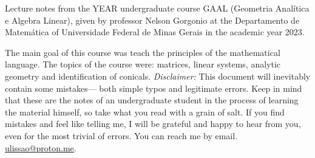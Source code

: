 Lecture notes from the YEAR undergraduate course GAAL (Geometria Analítica e Algebra Linear), given by professor
Nelson Gorgonio at the Departamento de Matemática of Universidade Federal de Minas Gerais in the academic year 2023.

The main goal of this course was teach the principles of the mathematical language. The topics of the course were: matrices, linear systems, analytic geometry  and identification of conicals.
\textit{Disclaimer:} This document will inevitably contain some mistakes— both
simple typos and legitimate errors. Keep in mind that these are the notes of an
undergraduate student in the process of learning the material himself, so take
what you read with a grain of salt. If you find mistakes and feel like telling
me, I will be grateful and happy to hear from you, even for the most trivial of
errors. You can reach me by email.
\href{mailto:ulissao@proton.me}{ulissao@proton.me}.
